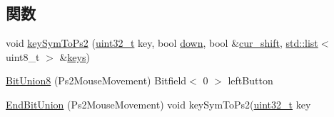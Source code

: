 \subsection*{関数}
\begin{DoxyCompactItemize}
\item 
void \hyperlink{namespacePs2_a5599df131a06c99284c4ceb9c1b83fd6}{keySymToPs2} (\hyperlink{Type_8hh_a435d1572bf3f880d55459d9805097f62}{uint32\_\-t} key, bool \hyperlink{namespacePs2_ac30355235d44e8f7b0a538a510bcbbeb}{down}, bool \&\hyperlink{namespacePs2_a7110d60593b39f7b7eba87904e2ae359}{cur\_\-shift}, \hyperlink{classstd_1_1list}{std::list}$<$ uint8\_\-t $>$ \&\hyperlink{namespacePs2_a9c0125dcc49548ab16bf4d1b20c4b381}{keys})
\item 
\hyperlink{namespacePs2_a188d558479ae253a9f17963c50406f58}{BitUnion8} (Ps2MouseMovement) Bitfield$<$ 0 $>$ leftButton
\item 
\hyperlink{namespacePs2_a35af99e63a47d5c34de1ade7d969b743}{EndBitUnion} (Ps2MouseMovement) void keySymToPs2(\hyperlink{Type_8hh_a435d1572bf3f880d55459d9805097f62}{uint32\_\-t} key
\end{DoxyCompactItemize}
